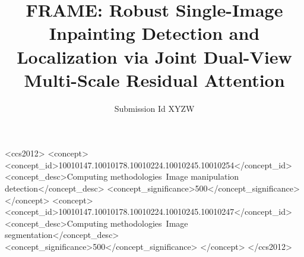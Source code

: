\documentclass[sigconf, review=true]{acmart}
\begin{document}
\title{FRAME: Robust Single-Image Inpainting Detection and Localization via Joint Dual-View Multi-Scale Residual Attention}
\author{Submission Id XYZW}
\renewcommand{\shortauthors}{Submission Id XYZW}



\begin{CCSXML}
<ccs2012>
   <concept>
       <concept_id>10010147.10010178.10010224.10010245.10010254</concept_id>
       <concept_desc>Computing methodologies~Image manipulation detection</concept_desc>
       <concept_significance>500</concept_significance>
       </concept>
   <concept>
       <concept_id>10010147.10010178.10010224.10010245.10010247</concept_id>
       <concept_desc>Computing methodologies~Image segmentation</concept_desc>
       <concept_significance>500</concept_significance>
       </concept>
 </ccs2012>
\end{CCSXML}



\maketitle





\end{document}
